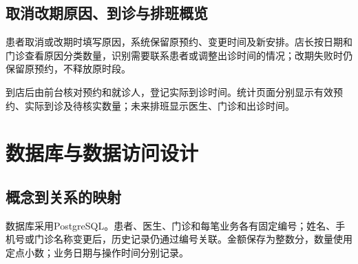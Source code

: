 \documentclass[UTF8,12pt,a4paper,fontset=none]{ctexart}
\begin{document}
\subsection{取消改期原因、到诊与排班概览}
患者取消或改期时填写原因，系统保留原预约、变更时间及新安排。店长按日期和门诊查看原因分类数量，识别需要联系患者或调整出诊时间的情况；改期失败时仍保留原预约，不释放原时段。\par
到店后由前台核对预约和就诊人，登记实际到诊时间。统计页面分别显示有效预约、实际到诊及待核实数量；未来排班显示医生、门诊和出诊时间。\par
{}
\section{数据库与数据访问设计}
\subsection{概念到关系的映射}
数据库采用Postgre\allowbreak{}SQL。患者、医生、门诊和每笔业务各有固定编号；姓名、手机号或门诊名称变更后，历史记录仍通过编号关联。金额保存为整数分，数量使用定点小数；业务日期与操作时间分别记录。\par
\end{document}
